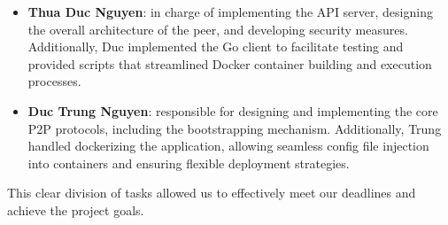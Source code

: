 \begin{itemize}

    \item \textbf{Thua Duc Nguyen}: in charge of implementing the API server, designing the overall architecture of the peer, and developing security measures. Additionally, Duc implemented the Go client to facilitate testing and provided scripts that streamlined Docker container building and execution processes.
    
    \item \textbf{Duc Trung Nguyen}:  responsible for designing and implementing the core P2P protocols, including the bootstrapping mechanism. Additionally, Trung handled dockerizing the application, allowing seamless config file injection into containers and ensuring flexible deployment strategies.

\end{itemize}

This clear division of tasks allowed us to effectively meet our deadlines and achieve the project goals.
